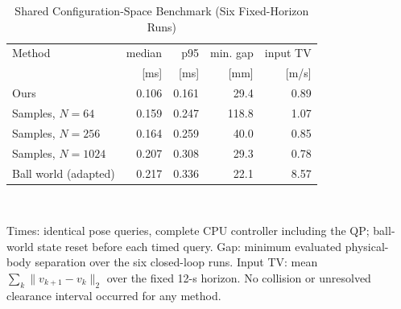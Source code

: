 \begin{table}[t]
\caption{Shared Configuration-Space Benchmark (Six Fixed-Horizon Runs)}
\label{tab:three-baselines}
\centering\footnotesize
\setlength{\tabcolsep}{3pt}
\begin{tabular}{lrrrr}
\toprule
Method & median & p95 & min. gap & input TV\\
 & [ms] & [ms] & [mm] & [m/s]\\
\midrule
Ours & 0.106 & 0.161 & 29.4 & 0.89 \\
Samples, $N=64$ & 0.159 & 0.247 & 118.8 & 1.07 \\
Samples, $N=256$ & 0.164 & 0.259 & 40.0 & 0.85 \\
Samples, $N=1024$ & 0.207 & 0.308 & 29.3 & 0.78 \\
Ball world (adapted) & 0.217 & 0.336 & 22.1 & 8.57 \\
\bottomrule
\end{tabular}
\\[3pt]
\parbox{\columnwidth}{\footnotesize Times: identical pose queries, complete CPU
controller including the QP; ball-world state reset before each timed query.
Gap: minimum evaluated physical-body separation over the six closed-loop runs.
Input TV: mean $\sum_k\|v_{k+1}-v_k\|_2$ over the fixed 12-s horizon.
No collision or unresolved clearance interval occurred for any method.}
\end{table}
